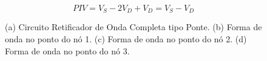 \documentclass[a4paper]{article} %
\begin{document}
\begin{equation}
PIV=V_S-2V_D+V_D=V_S-V_D
\end{equation}

\begin{figure}[h!]
\begin{centering}
\subfloat[]{

 \label{fig:ret-circ2(a)}
}
\par\end{centering}

\caption{(a) Circuito Retificador de Onda Completa tipo Ponte. (b) Forma de onda
no ponto do nó 1. (c) Forma de onda no ponto do nó 2. (d) Forma de onda no ponto do nó 3. \label{fig:ret-circ2}}
\end{figure}
\end{document}
